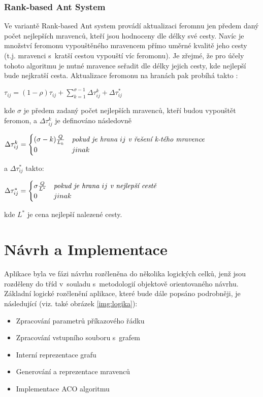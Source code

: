 \documentclass[a4paper, 12pt]{article}
\begin{document}
\subsubsection{Rank-based Ant System}
Ve variantě Rank-based Ant system provádí aktualizaci feromnu jen předem daný počet nejlepších mravenců, kteří jsou hodnoceny dle délky své cesty.
Navíc je množství feromonu vypouštěného mravencem přímo uměrné kvalitě jeho cesty (t.j. mravenci s~kratší cestou vypouští víc feromonu). Je zřejmé,
že pro účely tohoto algoritmu je nutné mravence seřadit dle délky jejich cesty, kde nejlepší bude nejkratší cesta. Aktualizace feromonu na hranách pak
probíhá takto \cite{aco:ranked}:
\begin{center}
  $\tau_{ij}=(1-\rho)\tau_{ij}+\sum\limits_{k=1}^{\sigma-1}\Delta\tau_{ij}^k + \Delta\tau_{ij}^*$
\end{center}
  kde $\sigma$ je předem zadaný počet nejlepších mravenců, kteří budou vypouštět feromon, a $\Delta\tau_{ij}^k$ je definováno následovně
\begin{center}
  $\Delta\tau_{ij}^k = 
 \begin{cases}
  (\sigma - k)\frac{Q}{L_k} & \emph{pokud je hrana } ij \emph{ v~řešení k-tého mravence}\\
  0 & jinak
 \end{cases}
$
\end{center}
a $\Delta\tau_{ij}^*$ takto:
\begin{center}
$\Delta\tau_{ij}^* = 
 \begin{cases}
  \sigma\frac{Q}{L^*} & \emph{pokud je hrana } ij \emph{ v~nejlepší cestě}\\
  0 & jinak
 \end{cases}
   $
\end{center}
kde $L^*$ je cena nejlepší nalezené cesty.

\section{Návrh a Implementace}
\label{sec:design}
Aplikace byla ve fázi návrhu rozčleněna do několika logických celků, jenž jsou rozděleny do tříd v~souladu s~metodologií
objektově orientovaného návrhu. Základní logické rozčlenění aplikace, které bude dále popsáno podrobněji, je následující (viz. také obrázek
\ref{img:logika}):
\begin{itemize}
  \item Zpracování parametrů příkazového řádku
  \item Zpracování vstupního souboru s~grafem
  \item Interní reprezentace grafu
  \item Generování a reprezentace mravenců
  \item Implementace ACO algoritmu
\end{itemize}
\end{document}
